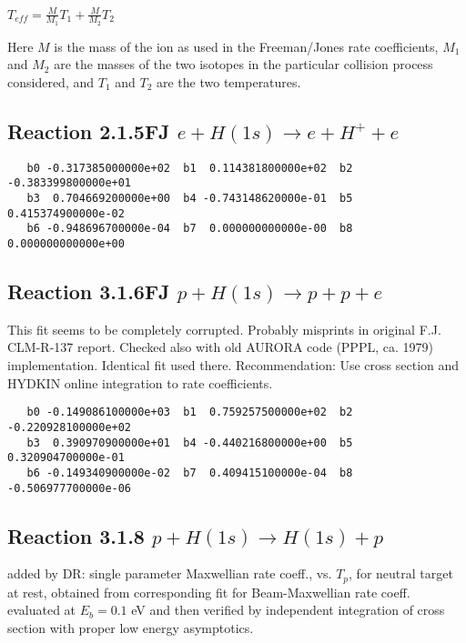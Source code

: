 \documentclass[12pt,dvipdfmx]{article}
\begin{document}
$T_{eff} = \frac {M}{M_1} T_1 + \frac{M}{M_2} T_2 $

Here $M$ is the mass of the ion as used in the Freeman/Jones rate coefficients,
$M_1$ and $M_2$ are the masses of the two isotopes in the particular collision
process considered, and $T_1$ and $T_2$ are the two temperatures.

\bigskip

\subsection{
Reaction 2.1.5FJ  $e + H(1s) \rightarrow e + H^+ + e$
}


\begin{small}\begin{verbatim}
   b0 -0.317385000000e+02  b1  0.114381800000e+02  b2 -0.383399800000e+01
   b3  0.704669200000e+00  b4 -0.743148620000e-01  b5  0.415374900000e-02
   b6 -0.948696700000e-04  b7  0.000000000000e-00  b8  0.000000000000e+00
\end{verbatim}\end{small}

\subsection{
Reaction 3.1.6FJ  $p + H(1s) \rightarrow p + p + e $
}
This fit seems to be completely corrupted. Probably misprints in original F.J. CLM-R-137 report.
Checked also with old AURORA code (PPPL, ca. 1979) implementation. Identical fit used there.
Recommendation: Use cross section and HYDKIN online integration to rate coefficients.

\begin{small}\begin{verbatim}
   b0 -0.149086100000e+03  b1  0.759257500000e+02  b2 -0.220928100000e+02
   b3  0.390970900000e+01  b4 -0.440216800000e+00  b5  0.320904700000e-01
   b6 -0.149340900000e-02  b7  0.409415100000e-04  b8 -0.506977700000e-06
\end{verbatim}\end{small}

\subsection{
Reaction 3.1.8 $  p + H(1s) \rightarrow H(1s) + p$}

added by DR: single parameter Maxwellian rate coeff., vs. $T_p$, for neutral target at rest,
obtained from corresponding fit for Beam-Maxwellian rate coeff. evaluated at $E_b =0.1$ eV
and then verified by independent integration of cross section with proper low energy asymptotics.
\end{document}
